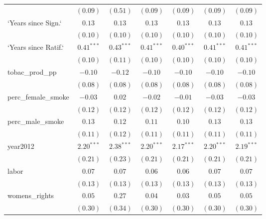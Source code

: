 \begin{table}[!h]
\begin{center}
\begin{tabular}{l c c c c c c }
                        & $(0.09)$     & $(0.51)$     & $(0.09)$     & $(0.09)$     & $(0.09)$     & $(0.09)$     \\
`Years since Sign.`     & $0.13$       & $0.13$       & $0.13$       & $0.13$       & $0.13$       & $0.13$       \\
                        & $(0.10)$     & $(0.10)$     & $(0.10)$     & $(0.10)$     & $(0.10)$     & $(0.10)$     \\
`Years since Ratif.`    & $0.41^{***}$ & $0.43^{***}$ & $0.41^{***}$ & $0.40^{***}$ & $0.41^{***}$ & $0.41^{***}$ \\
                        & $(0.10)$     & $(0.11)$     & $(0.10)$     & $(0.10)$     & $(0.10)$     & $(0.10)$     \\
tobac\_prod\_pp         & $-0.10$      & $-0.12$      & $-0.10$      & $-0.10$      & $-0.10$      & $-0.10$      \\
                        & $(0.08)$     & $(0.08)$     & $(0.08)$     & $(0.08)$     & $(0.08)$     & $(0.08)$     \\
perc\_female\_smoke     & $-0.03$      & $0.02$       & $-0.02$      & $-0.01$      & $-0.03$      & $-0.03$      \\
                        & $(0.12)$     & $(0.12)$     & $(0.12)$     & $(0.12)$     & $(0.12)$     & $(0.12)$     \\
perc\_male\_smoke       & $0.13$       & $0.12$       & $0.11$       & $0.10$       & $0.13$       & $0.13$       \\
                        & $(0.11)$     & $(0.12)$     & $(0.11)$     & $(0.11)$     & $(0.11)$     & $(0.11)$     \\
year2012                & $2.20^{***}$ & $2.38^{***}$ & $2.20^{***}$ & $2.17^{***}$ & $2.20^{***}$ & $2.19^{***}$ \\
                        & $(0.21)$     & $(0.23)$     & $(0.21)$     & $(0.21)$     & $(0.21)$     & $(0.21)$     \\
labor                   & $0.07$       & $0.07$       & $0.06$       & $0.06$       & $0.07$       & $0.07$       \\
                        & $(0.13)$     & $(0.13)$     & $(0.13)$     & $(0.13)$     & $(0.13)$     & $(0.13)$     \\
womens\_rights          & $0.05$       & $0.27$       & $0.04$       & $0.03$       & $0.05$       & $0.05$       \\
                        & $(0.30)$     & $(0.34)$     & $(0.30)$     & $(0.30)$     & $(0.30)$     & $(0.30)$     \\

\end{tabular}
\end{center}
\end{table}
